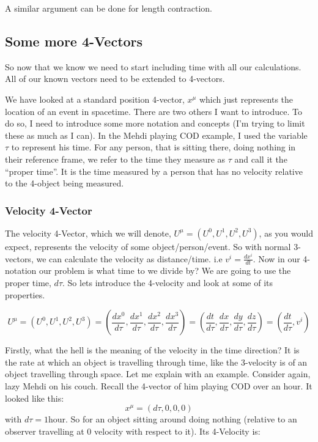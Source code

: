 A similar argument can be done for length contraction.

\subsection{Some more 4-Vectors}
So now that we know we need to start including time with all our calculations. All of our known vectors need to be extended to 4-vectors. 

We have looked at a standard position 4-vector, $x^\mu$ which just represents the location of an event in spacetime. There are two others I want to introduce. To do so, I need to introduce some more notation and concepts (I'm trying to limit these as much as I can). In the Mehdi playing COD example, I used the variable $\tau$ to represent his time. For any person, that is sitting there, doing nothing in their reference frame, we refer to the time they measure as $\tau$ and call it the ``proper time''. It is the time measured by a person that has no velocity relative to the 4-object being measured.  

\subsubsection{Velocity 4-Vector}
The velocity 4-Vector, which we will denote, $U^\mu = (U^0, U^1, U^2, U^3)$, as you would expect, represents the velocity of some object/person/event. So with normal 3-vectors, we can calculate the velocity as distance/time. i.e $v^i = \frac{dx^i}{dt}$. Now in our 4-notation our problem is what time to we divide by? We are going to use the proper time, $d\tau$. So lets introduce the 4-velocity and look at some of its properties. 

\begin{equation}
  U^\mu = (U^0, U^1, U^2, U^3) = (\frac{dx^0}{d\tau}, \frac{dx^1}{d\tau},\frac{dx^2}{d\tau},\frac{dx^3}{d\tau}) = (\frac{dt}{d\tau}, \frac{dx}{d\tau},\frac{dy}{d\tau},\frac{dz}{d\tau}) = (\frac{dt}{d\tau}, v^i)
\end{equation}

Firstly, what the hell is the meaning of the velocity in the time direction? It is the rate at which an object is travelling through time, like the 3-velocity is of an object travelling through space. Let me explain with an example. Consider again, lazy Mehdi on his couch. Recall the 4-vector of him playing COD over an hour. It looked like this:
\begin{equation}
  x^\mu = (d\tau, 0,0,0) 
\end{equation}
with $d\tau = 1$hour. So for an object sitting around doing nothing (relative to an observer travelling at 0 velocity with respect to it). Its 4-Velocity is:


